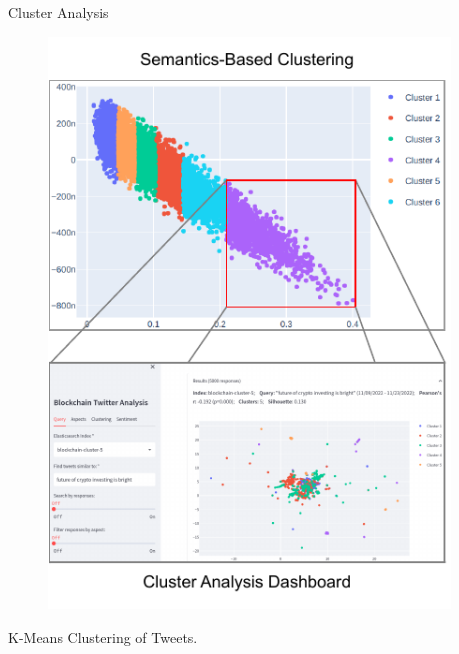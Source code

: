\documentclass[final]{beamer}
\begin{document}
\begin{frame}[t]
\begin{columns}[t]
\begin{column}{0.73\paperwidth}
			\vspace{-1em}
			\begin{block}{Cluster Analysis}
				\vspace{-6em}
				\begin{minipage}[t]{0.23\textwidth}
					\centering
					\vspace{0pt}
					\begin{figure}
						\centering
						\includegraphics[width=0.95\textwidth]{./figures/Methodology//blockchain-twitter-analysis-workflow.pdf}
					\end{figure}
					\vspace{-1em}
					{\color{rpi_darkgray} \small K-Means Clustering of Tweets.}
				\end{minipage}%
				\begin{minipage}[t]{0.76\textwidth}
					\vspace{0pt}
					\centering
					{
						\large
						\begin{itemize}

\end{itemize}}
\end{minipage}
\end{block}
\end{column}
\end{columns}
\end{frame}
\end{document}
